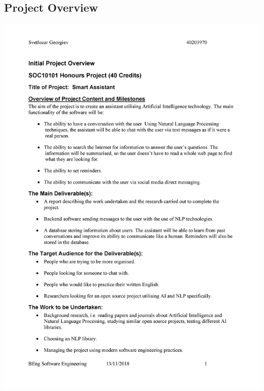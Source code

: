 \documentclass[12pt,a4paper]{article}
\begin{document}
\newpage
\begin{appendices}
\section{Project Overview}
\includegraphics[width=\textwidth,height=\textheight,keepaspectratio]{IPO-0.png} %
\newpage

\end{appendices}
\end{document}
